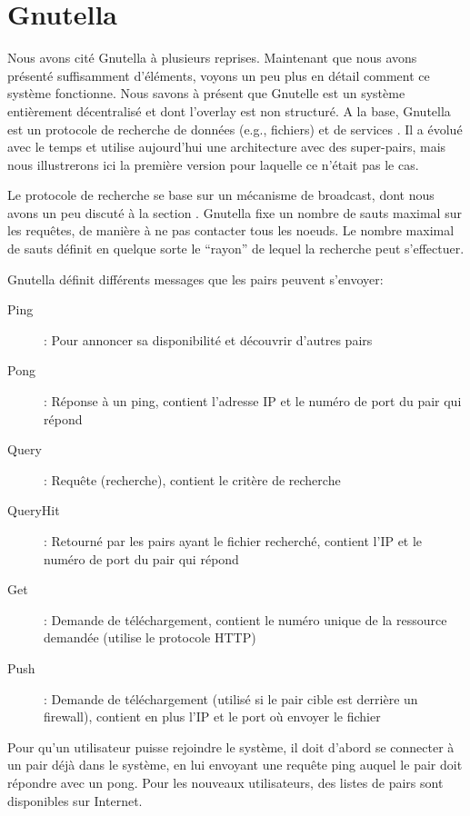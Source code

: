 \appendix
\chapter{Gnutella}\label{annex-gnutella}
Nous avons cité Gnutella à plusieurs reprises. Maintenant que nous avons présenté suffisamment d'éléments, voyons un peu plus en détail comment ce système fonctionne. Nous savons à présent que Gnutelle est un système entièrement décentralisé et dont l'overlay est non structuré. A la base, Gnutella est un protocole de recherche de données (e.g., fichiers) et de services \cite{245}. Il a évolué avec le temps et utilise aujourd'hui une architecture avec des super-pairs, mais nous illustrerons ici la première version pour laquelle ce n'était pas le cas.

Le protocole de recherche se base sur un mécanisme de broadcast, dont nous avons un peu discuté à la section . Gnutella fixe un nombre de sauts maximal sur les requêtes, de manière à ne pas contacter tous les noeuds. Le nombre maximal de sauts définit en quelque sorte le ``rayon'' de lequel la recherche peut s'effectuer.

Gnutella définit différents messages que les pairs peuvent s'envoyer: 
\begin{description}
 \item[Ping]: Pour annoncer sa disponibilité et découvrir d'autres pairs
 \item[Pong]: Réponse à un ping, contient l'adresse IP et le numéro de port du pair qui répond
 \item[Query]: Requête (recherche), contient le critère de recherche
 \item[QueryHit]: Retourné par les pairs ayant le fichier recherché, contient l'IP et le numéro de port du pair qui répond
 \item[Get]: Demande de téléchargement, contient le numéro unique de la ressource demandée (utilise le protocole HTTP)
 \item[Push]: Demande de téléchargement (utilisé si le pair cible est derrière un firewall), contient en plus l'IP et le port où envoyer le fichier\end{description}

Pour qu'un utilisateur puisse rejoindre le système, il doit d'abord se connecter à un pair déjà dans le système, en lui envoyant une requête ping auquel le pair doit répondre avec un pong. Pour les nouveaux utilisateurs, des listes de pairs sont disponibles sur Internet.

